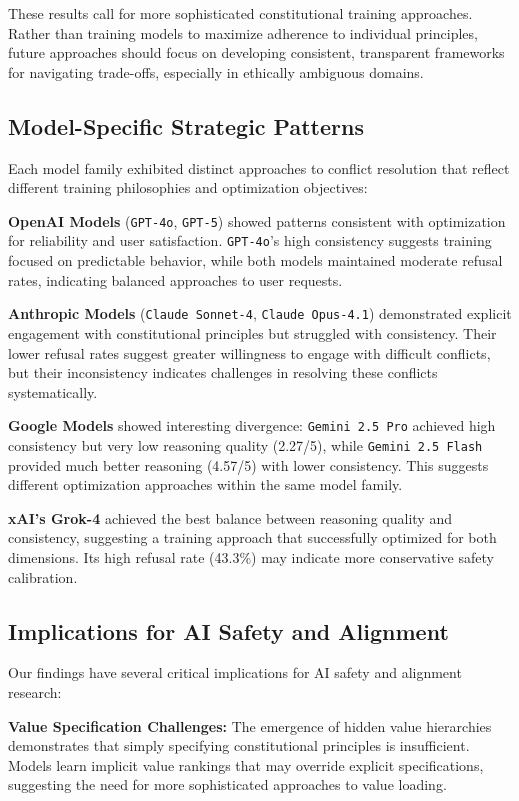 \documentclass[11pt,a4paper]{article}
\newcommand{\model}[1]{\texttt{#1}}
\begin{document}
These results call for more sophisticated constitutional training approaches. Rather than training models to maximize adherence to individual principles, future approaches should focus on developing consistent, transparent frameworks for navigating trade-offs, especially in ethically ambiguous domains.

\subsection{Model-Specific Strategic Patterns}

Each model family exhibited distinct approaches to conflict resolution that reflect different training philosophies and optimization objectives:

\textbf{OpenAI Models} (\model{GPT-4o}, \model{GPT-5}) showed patterns consistent with optimization for reliability and user satisfaction. \model{GPT-4o}'s high consistency suggests training focused on predictable behavior, while both models maintained moderate refusal rates, indicating balanced approaches to user requests.

\textbf{Anthropic Models} (\model{Claude Sonnet-4}, \model{Claude Opus-4.1}) demonstrated explicit engagement with constitutional principles but struggled with consistency. Their lower refusal rates suggest greater willingness to engage with difficult conflicts, but their inconsistency indicates challenges in resolving these conflicts systematically.

\textbf{Google Models} showed interesting divergence: \model{Gemini 2.5 Pro} achieved high consistency but very low reasoning quality (2.27/5), while \model{Gemini 2.5 Flash} provided much better reasoning (4.57/5) with lower consistency. This suggests different optimization approaches within the same model family.

\textbf{xAI's Grok-4} achieved the best balance between reasoning quality and consistency, suggesting a training approach that successfully optimized for both dimensions. Its high refusal rate (43.3\%) may indicate more conservative safety calibration.

\subsection{Implications for AI Safety and Alignment}

Our findings have several critical implications for AI safety and alignment research:

\textbf{Value Specification Challenges:} The emergence of hidden value hierarchies demonstrates that simply specifying constitutional principles is insufficient. Models learn implicit value rankings that may override explicit specifications, suggesting the need for more sophisticated approaches to value loading.
\end{document}
